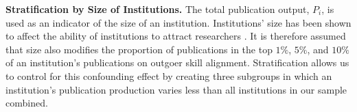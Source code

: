 \documentclass[draft,final]{vutinfth} %
\begin{document}
\textbf{Stratification by Size of Institutions.} The total publication output, $P_{i}$, is used as an indicator of the size of an institution. Institutions' size has been shown to affect the ability of institutions to attract researchers \cite{machavcek2022researchers, clauset2015systematic}. It is therefore assumed that size also modifies the proportion of publications in the top $1\%$, $5\%$, and $10\%$ of an institution's publications on outgoer skill alignment. Stratification allows us to control for this confounding effect by creating three subgroups in which an institution's publication production varies less than all institutions in our sample combined.

\end{document}
